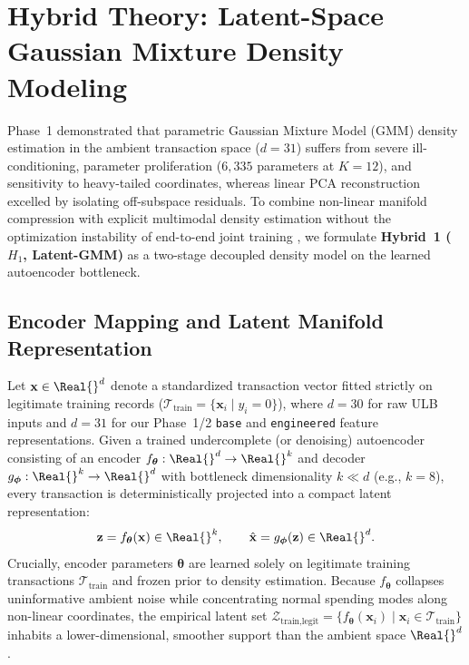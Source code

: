 
\section{Hybrid Theory: Latent-Space Gaussian Mixture Density Modeling}
\label{sec:p2_hybrid_theory}

Phase~1 demonstrated that parametric Gaussian Mixture Model (GMM) density estimation in the ambient transaction space ($d=31$) suffers from severe ill-conditioning, parameter proliferation ($6{,}335$ parameters at $K=12$), and sensitivity to heavy-tailed coordinates, whereas linear PCA reconstruction excelled by isolating off-subspace residuals. To combine non-linear manifold compression with explicit multimodal density estimation without the optimization instability of end-to-end joint training \cite{zong2018deep}, we formulate \textbf{Hybrid~1 ($H_1$, Latent-GMM)} as a two-stage decoupled density model on the learned autoencoder bottleneck.

\subsection{Encoder Mapping and Latent Manifold Representation}
\label{sec:p2_latent_mapping}
Let $\mathbf{x} \in \Real{}^d$ denote a standardized transaction vector fitted strictly on legitimate training records ($\mathcal{T}_{\text{train}} = \{\mathbf{x}_i \mid y_i = 0\}$), where $d=30$ for raw ULB inputs and $d=31$ for our Phase~1/2 \texttt{base} and \texttt{engineered} feature representations. Given a trained undercomplete (or denoising) autoencoder \cite{hinton2006reducing, sakurada2014anomaly} consisting of an encoder $f_{\boldsymbol{\theta}}: \Real{}^d \to \Real{}^k$ and decoder $g_{\boldsymbol{\phi}}: \Real{}^k \to \Real{}^d$ with bottleneck dimensionality $k \ll d$ (e.g., $k=8$), every transaction is deterministically projected into a compact latent representation:
\begin{equation}
    \mathbf{z} = f_{\boldsymbol{\theta}}(\mathbf{x}) \in \Real{}^k, \qquad \hat{\mathbf{x}} = g_{\boldsymbol{\phi}}(\mathbf{z}) \in \Real{}^d.
    \label{eq:latent_map}
\end{equation}
Crucially, encoder parameters $\boldsymbol{\theta}$ are learned solely on legitimate training transactions $\mathcal{T}_{\text{train}}$ and frozen prior to density estimation. Because $f_{\boldsymbol{\theta}}$ collapses uninformative ambient noise while concentrating normal spending modes along non-linear coordinates, the empirical latent set $\mathcal{Z}_{\text{train,legit}} = \{f_{\boldsymbol{\theta}}(\mathbf{x}_i) \mid \mathbf{x}_i \in \mathcal{T}_{\text{train}}\}$ inhabits a lower-dimensional, smoother support than the ambient space $\Real{}^d$.

